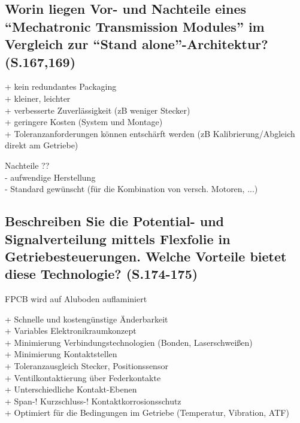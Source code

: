 \subsection{Worin liegen Vor- und Nachteile eines ``Mechatronic Transmission Modules'' im Vergleich zur ``Stand alone''-Architektur? (S.167,169)}
+ kein redundantes Packaging \\
+ kleiner, leichter \\
+ verbesserte Zuverlässigkeit (zB weniger Stecker) \\
+ geringere Kosten (System und Montage) \\
+ Toleranzanforderungen können entschärft werden (zB Kalibrierung/Abgleich direkt am Getriebe)

Nachteile ?? \\
- aufwendige Herstellung \\
- Standard gewünscht (für die Kombination von versch. Motoren, ...)

\subsection{Beschreiben Sie die Potential- und Signalverteilung mittels Flexfolie in Getriebesteuerungen. Welche Vorteile bietet diese Technologie? (S.174-175)}
FPCB wird auf Aluboden auflaminiert

+ Schnelle und kostengünstige Änderbarkeit \\
+ Variables Elektronikraumkonzept \\
+ Minimierung Verbindungstechnologien (Bonden, Laserschweißen) \\
+ Minimierung Kontaktstellen \\
+ Toleranzausgleich Stecker, Positionssensor \\
+ Ventilkontaktierung über Federkontakte \\
+ Unterschiedliche Kontakt-Ebenen \\
+ Span-! Kurzschluss-! Kontaktkorrosionsschutz \\
+ Optimiert für die Bedingungen im Getriebe (Temperatur, Vibration, ATF)

